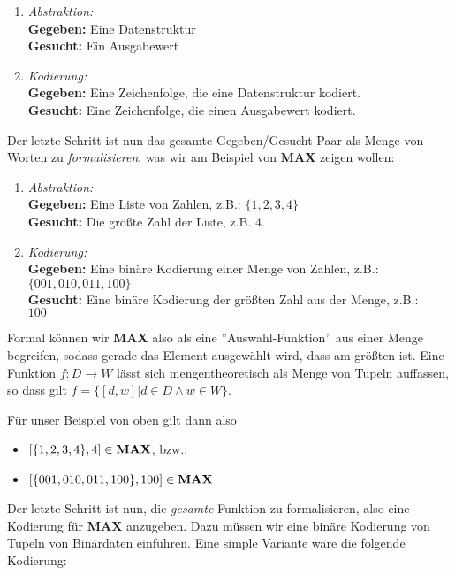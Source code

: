 \begin{enumerate}
    \item \emph{Abstraktion:}
        \\\textbf{Gegeben:} Eine Datenstruktur
        \\\textbf{Gesucht:} Ein Ausgabewert
    \item \emph{Kodierung:}
        \\\textbf{Gegeben:} Eine Zeichenfolge, die eine Datenstruktur kodiert.
        \\\textbf{Gesucht:} Eine Zeichenfolge, die einen Ausgabewert kodiert.
\end{enumerate}
Der letzte Schritt ist nun das gesamte Gegeben/Gesucht-Paar
als Menge von Worten zu \emph{formalisieren},
was wir am Beispiel von \textbf{MAX} zeigen wollen:
\begin{enumerate}
    \item \emph{Abstraktion:}
        \\\textbf{Gegeben:} Eine Liste von Zahlen, z.B.: $\{1,2,3,4\}$
        \\\textbf{Gesucht:} Die größte Zahl der Liste, z.B. $4$.
    \item \emph{Kodierung:}
        \\\textbf{Gegeben:} Eine binäre Kodierung einer Menge von Zahlen, z.B.:
        \\$\{001, 010, 011, 100\}$
        \\\textbf{Gesucht:} Eine binäre Kodierung der größten Zahl aus der Menge, z.B.:
        \\$100$
\end{enumerate}

Formal können wir \textbf{MAX} also als eine ''Auswahl-Funktion'' aus einer Menge begreifen,
sodass gerade das Element ausgewählt wird, dass am größten ist.
Eine Funktion $f: D \rightarrow W$ lässt sich mengentheoretisch als Menge von Tupeln auffassen,
so dass gilt $f = \{[d,w]|d \in D \wedge w \in W\}$.

\noindent
Für unser Beispiel von oben gilt dann also
\begin{itemize}
    \item $[\{1,2,3,4\},4] \in \bf{MAX}$, bzw.:
    \item $[\{001, 010, 011, 100\}, 100] \in \bf{MAX}$
\end{itemize}

Der letzte Schritt ist nun, die \emph{gesamte} Funktion zu formalisieren, also eine Kodierung
für \textbf{MAX} anzugeben.
Dazu müssen wir eine binäre Kodierung von Tupeln von Binärdaten einführen.
Eine simple Variante wäre die folgende Kodierung:
